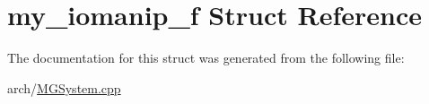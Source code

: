 \hypertarget{structmy__iomanip__f}{\section{my\+\_\+iomanip\+\_\+f Struct Reference}
\label{structmy__iomanip__f}
}


The documentation for this struct was generated from the following file\+:\begin{DoxyCompactItemize}
\item 
arch/\hyperlink{_m_g_system_8cpp}{M\+G\+System.\+cpp}\end{DoxyCompactItemize}
